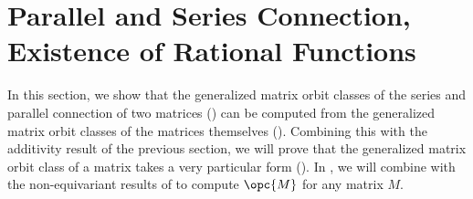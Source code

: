 \documentclass[12pt]{amsart}
\theoremstyle{plain}
\theoremstyle{definition}
\theoremstyle{remark}
\begin{document}

\section{Parallel and Series Connection, Existence of Rational Functions}
\label{ParAndSer}


In this section, we show that the generalized matrix orbit classes of the series and parallel connection of two matrices () can be computed from the generalized matrix orbit classes of the matrices themselves (). Combining this with the additivity result of the previous section, we will prove that the generalized matrix orbit class of a matrix takes a very particular form (). In , we will combine  with the non-equivariant results of  to compute $\opc{M}$ for any matrix $M$.
\end{document}
